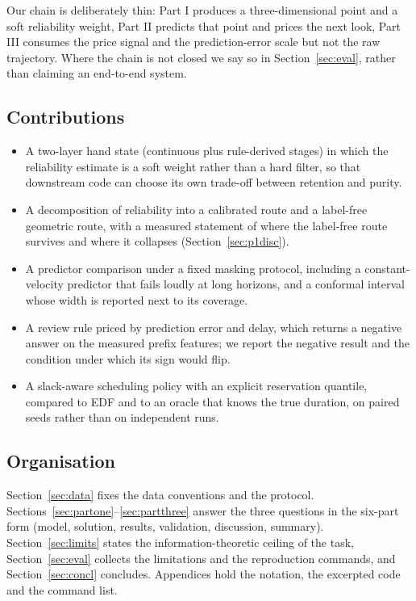\documentclass{swmcmthesis}
\begin{document}
Our chain is deliberately thin: Part I produces a three-dimensional point and a soft reliability
weight, Part II predicts that point and prices the next look, Part III consumes
the price signal and the prediction-error scale but not the raw trajectory. Where
the chain is not closed we say so in Section~\ref{sec:eval}, rather than claiming
an end-to-end system.

\subsection{Contributions}

\begin{itemize}
  \item A two-layer hand state (continuous plus \slotNStages{} rule-derived
        stages) in which the reliability estimate is a soft weight rather than a
        hard filter, so that downstream code can choose its own trade-off between
        retention and purity.
  \item A decomposition of reliability into a calibrated route and a label-free
        geometric route, with a measured statement of where the label-free route
        survives and where it collapses (Section~\ref{sec:p1disc}).
  \item A predictor comparison under a fixed masking protocol, including a
        constant-velocity predictor that fails loudly at long horizons, and a
        conformal interval whose width is reported next to its coverage.
  \item A review rule priced by prediction error and delay, which returns a
        negative answer on the measured prefix features; we report the negative
        result and the condition under which its sign would flip.
  \item A slack-aware scheduling policy with an explicit reservation quantile,
        compared to EDF and to an oracle that knows the true duration, on paired
        seeds rather than on independent runs.
\end{itemize}

\subsection{Organisation}

Section~\ref{sec:data} fixes the data conventions and the protocol.
Sections~\ref{sec:partone}--\ref{sec:partthree} answer the three questions in the
six-part form (model, solution, results, validation, discussion, summary).
Section~\ref{sec:limits} states the information-theoretic ceiling of the task,
Section~\ref{sec:eval} collects the limitations and the reproduction commands, and
Section~\ref{sec:concl} concludes. Appendices hold the notation, the excerpted
code and the command list.
\end{document}
